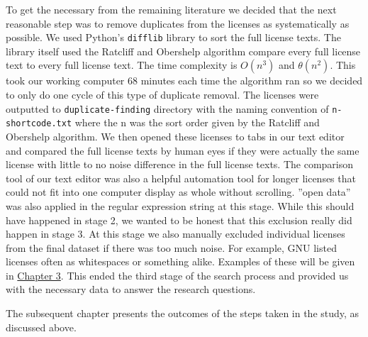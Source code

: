 To get the necessary from the remaining literature we decided that the next reasonable step was to remove duplicates from the licenses as systematically as possible. We used Python's \texttt{difflib} library to sort the full license texts. The library itself used the Ratcliff and Obershelp algorithm compare every full license text to every full license text. The time complexity is $O(n^3)$ and $\theta(n^2)$. This took our working computer 68 minutes each time the algorithm ran so we decided to only do one cycle of this type of duplicate removal. The licenses were outputted to \texttt{duplicate-finding} directory with the naming convention of \texttt{n-shortcode.txt} where the n was the sort order given by the Ratcliff and Obershelp algorithm. We then opened these licenses to tabs in our text editor and compared the full license texts by human eyes if they were actually the same license with little to no noise difference in the full license texts. The comparison tool of our text editor was also a helpful automation tool for longer licenses that could not fit into one computer display as whole without scrolling. ''open data'' was also applied in the regular expression string at this stage. While this should have happened in stage 2, we wanted to be honest that this exclusion really did happen in stage 3. At this stage we also manually excluded individual licenses from the final dataset if there was too much noise. For example, GNU listed licenses often as whitespaces or something alike.  Examples of these will be given in \hyperref[results]{Chapter 3}. This ended the third stage of the search process and provided us with the necessary data to answer the research questions.

The subsequent chapter presents the outcomes of the steps taken in the study, as discussed above.
